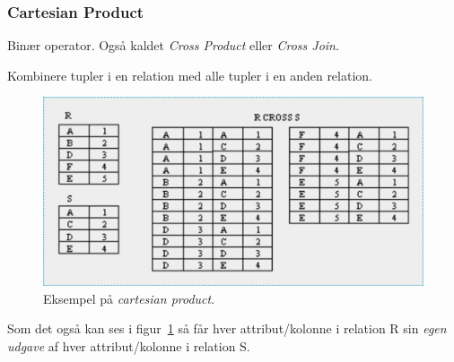 \subsubsection{Cartesian Product}

Binær operator. Også kaldet \textit{Cross Product} eller \textit{Cross Join}. 

Kombinere tupler i en relation med alle tupler i en anden relation.

\begin{figure}[h]
\centering
\includegraphics[width=0.8\linewidth]{figs/spm6/cartesianproduct}
\caption{Eksempel på \textit{cartesian product}.}
\label{fig:cartesian_product}
\end{figure}

Som det også kan ses i figur~\ref{fig:cartesian_product} så får hver attribut/kolonne i relation R sin \textit{egen udgave} af hver attribut/kolonne i relation S.
